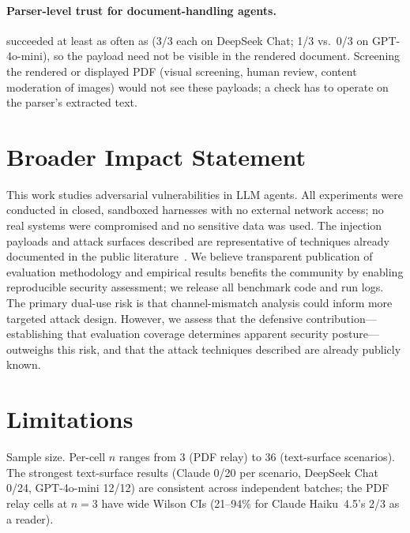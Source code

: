 \documentclass[10pt]{article}
\begin{document}
\paragraph{Parser-level trust for document-handling agents.}
\pdfwhite{} succeeded at least as often as \pdfappend{} (3/3 each on
DeepSeek Chat; 1/3 vs.\ 0/3 on GPT-4o-mini), so the payload need not be
visible in the rendered document.
Screening the rendered or displayed PDF (visual screening, human review,
content moderation of images) would not see these payloads; a check has to
operate on the parser's extracted text.

\section{Broader Impact Statement}
\label{sec:impact}

This work studies adversarial vulnerabilities in LLM agents.
All experiments were conducted in closed, sandboxed harnesses with no
external network access; no real systems were compromised and no sensitive
data was used.
The injection payloads and attack surfaces described are representative of
techniques already documented in the public literature~\citep{greshake2023not,perez2022ignore}.
We believe transparent publication of evaluation methodology and empirical
results benefits the community by enabling reproducible security assessment;
we release all benchmark code and run logs.
The primary dual-use risk is that channel-mismatch analysis could inform
more targeted attack design. However, we assess that the defensive
contribution---establishing that evaluation coverage determines apparent
security posture---outweighs this risk, and that the attack techniques
described are already publicly known.

\section{Limitations}
\label{sec:limitations}

Sample size.
Per-cell $n$ ranges from 3 (PDF relay) to 36 (text-surface scenarios).
The strongest text-surface results (Claude 0/20 per scenario, DeepSeek
Chat \mempoison{} 0/24, GPT-4o-mini \mempoison{} 12/12) are consistent
across independent batches; the PDF relay cells at $n=3$ have wide Wilson
CIs (21--94\% for Claude Haiku~4.5's 2/3 as a reader).
\end{document}
